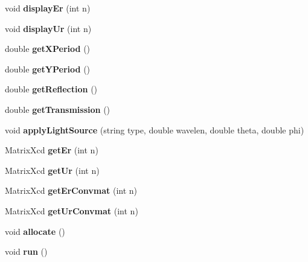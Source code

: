 \begin{DoxyCompactItemize}
\item 
void {\bfseries display\+Er} (int n)\hypertarget{class_r_c_w_a_aa5a374bdf07c822d63c0a6ca64d3079f}{}\label{class_r_c_w_a_aa5a374bdf07c822d63c0a6ca64d3079f}

\item 
void {\bfseries display\+Ur} (int n)\hypertarget{class_r_c_w_a_a717f67cbafdd2fa924d4b857c816a8b6}{}\label{class_r_c_w_a_a717f67cbafdd2fa924d4b857c816a8b6}

\item 
double {\bfseries get\+X\+Period} ()\hypertarget{class_r_c_w_a_a9f748293ac49e7b5e925c6195ed9fb67}{}\label{class_r_c_w_a_a9f748293ac49e7b5e925c6195ed9fb67}

\item 
double {\bfseries get\+Y\+Period} ()\hypertarget{class_r_c_w_a_a1706fec03db0103e26f87c407d5a6423}{}\label{class_r_c_w_a_a1706fec03db0103e26f87c407d5a6423}

\item 
double {\bfseries get\+Reflection} ()\hypertarget{class_r_c_w_a_a42993768df1f10f922057a1493335258}{}\label{class_r_c_w_a_a42993768df1f10f922057a1493335258}

\item 
double {\bfseries get\+Transmission} ()\hypertarget{class_r_c_w_a_a2aa0627fec4987a92dd1bf2e357af5a5}{}\label{class_r_c_w_a_a2aa0627fec4987a92dd1bf2e357af5a5}

\item 
void {\bfseries apply\+Light\+Source} (string type, double wavelen, double theta, double phi)\hypertarget{class_r_c_w_a_a1017dff6661c71d7386c46421cc743f1}{}\label{class_r_c_w_a_a1017dff6661c71d7386c46421cc743f1}

\item 
Matrix\+Xcd {\bfseries get\+Er} (int n)\hypertarget{class_r_c_w_a_ade34adb639273d0ebfad589e31c7f89c}{}\label{class_r_c_w_a_ade34adb639273d0ebfad589e31c7f89c}

\item 
Matrix\+Xcd {\bfseries get\+Ur} (int n)\hypertarget{class_r_c_w_a_afb20c852b4d36488e62103ba4cf7f519}{}\label{class_r_c_w_a_afb20c852b4d36488e62103ba4cf7f519}

\item 
Matrix\+Xcd {\bfseries get\+Er\+Convmat} (int n)\hypertarget{class_r_c_w_a_a7efad0b8ef6066a367248cf8a2a48ac8}{}\label{class_r_c_w_a_a7efad0b8ef6066a367248cf8a2a48ac8}

\item 
Matrix\+Xcd {\bfseries get\+Ur\+Convmat} (int n)\hypertarget{class_r_c_w_a_a4b7a304b5747d22a1b63f9276e7dcc71}{}\label{class_r_c_w_a_a4b7a304b5747d22a1b63f9276e7dcc71}

\item 
void {\bfseries allocate} ()\hypertarget{class_r_c_w_a_ad23dd76e53770a3bbf3998787628998d}{}\label{class_r_c_w_a_ad23dd76e53770a3bbf3998787628998d}

\item 
void {\bfseries run} ()\hypertarget{class_r_c_w_a_a2a9abf43b42c9d70653b9f4468187295}{}\label{class_r_c_w_a_a2a9abf43b42c9d70653b9f4468187295}

\end{DoxyCompactItemize}


